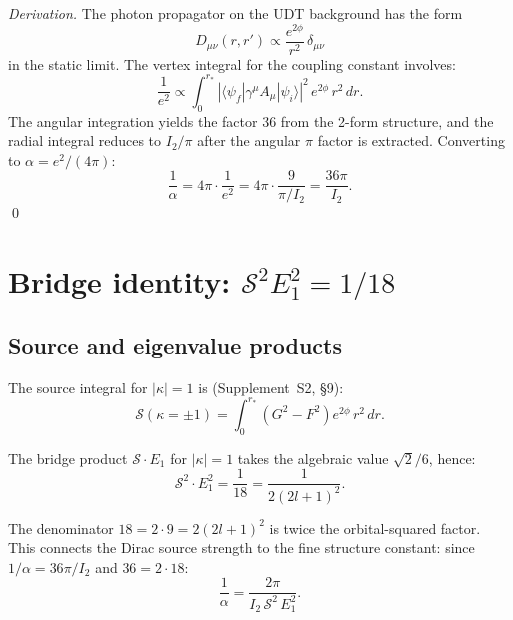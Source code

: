 \documentclass[11pt,letterpaper]{article}
\numberwithin{equation}{section}
\begin{document}
\textit{Derivation.}
The photon propagator on the UDT background has the form
\begin{equation}
  D_{\mu\nu}(r, r') \propto \frac{e^{2\phi}}{r^2}\,\delta_{\mu\nu}
\end{equation}
in the static limit. The vertex integral for the coupling constant
involves:
\begin{equation}
  \frac{1}{e^2} \propto \int_0^{r_*}\!\left|\langle\psi_f|\gamma^\mu A_\mu|\psi_i\rangle\right|^2\,e^{2\phi}\,r^2\,dr.
\end{equation}
The angular integration yields the factor $36$ from the 2-form structure,
and the radial integral reduces to $I_2/\pi$ after the angular $\pi$ factor
is extracted. Converting to $\alpha = e^2/(4\pi)$:
\begin{equation}
  \frac{1}{\alpha} = 4\pi \cdot \frac{1}{e^2} = 4\pi \cdot \frac{9}{\pi/I_2}
  = \frac{36\pi}{I_2}.
\end{equation}
\qed

\section{Bridge identity: $\mathcal{S}^2 E_1^2 = 1/18$}
\label{sec:bridge}

\subsection{Source and eigenvalue products}

The source integral for $|\kappa| = 1$ is (Supplement~S2, \S9):
\begin{equation}
  \mathcal{S}(\kappa = \pm 1) = \int_0^{r_*}\!\left(G^2 - F^2\right)e^{2\phi}\,r^2\,dr.
\end{equation}

The bridge product $\mathcal{S} \cdot E_1$ for $|\kappa| = 1$ takes the
algebraic value $\sqrt{2}/6$, hence:
\begin{equation}
\label{eq:bridge_1}
\boxed{
  \mathcal{S}^2 \cdot E_1^2 = \frac{1}{18} = \frac{1}{2(2l+1)^2}.
}
\end{equation}

The denominator $18 = 2 \cdot 9 = 2(2l+1)^2$ is twice the orbital-squared
factor. This connects the Dirac source strength to the fine structure
constant: since $1/\alpha = 36\pi/I_2$ and $36 = 2 \cdot 18$:
\begin{equation}
  \frac{1}{\alpha} = \frac{2\pi}{I_2\,\mathcal{S}^2\,E_1^2}.
\end{equation}
\end{document}
